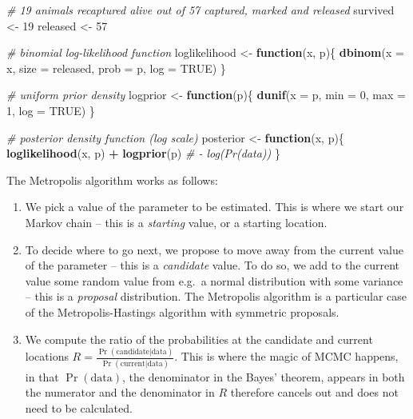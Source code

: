 \documentclass[
  12pt,
]{krantz}
\newenvironment{Shaded}{\begin{snugshade}}{\end{snugshade}}
\newcommand{\AttributeTok}[1]{\textcolor[rgb]{0.13,0.29,0.53}{#1}}
\newcommand{\CommentTok}[1]{\textcolor[rgb]{0.56,0.35,0.01}{\textit{#1}}}
\newcommand{\ConstantTok}[1]{\textcolor[rgb]{0.56,0.35,0.01}{#1}}
\newcommand{\ControlFlowTok}[1]{\textcolor[rgb]{0.13,0.29,0.53}{\textbf{#1}}}
\newcommand{\DecValTok}[1]{\textcolor[rgb]{0.00,0.00,0.81}{#1}}
\newcommand{\FunctionTok}[1]{\textcolor[rgb]{0.13,0.29,0.53}{\textbf{#1}}}
\newcommand{\NormalTok}[1]{#1}
\newcommand{\OtherTok}[1]{\textcolor[rgb]{0.56,0.35,0.01}{#1}}
\newcommand{\SpecialCharTok}[1]{\textcolor[rgb]{0.81,0.36,0.00}{\textbf{#1}}}
\begin{document}
\begin{Shaded}
\begin{Highlighting}[]
\CommentTok{\# 19 animals recaptured alive out of 57 captured, marked and released}
\NormalTok{survived }\OtherTok{\textless{}{-}} \DecValTok{19}
\NormalTok{released }\OtherTok{\textless{}{-}} \DecValTok{57}

\CommentTok{\# binomial log{-}likelihood function}
\NormalTok{loglikelihood }\OtherTok{\textless{}{-}} \ControlFlowTok{function}\NormalTok{(x, p)\{}
  \FunctionTok{dbinom}\NormalTok{(}\AttributeTok{x =}\NormalTok{ x, }\AttributeTok{size =}\NormalTok{ released, }\AttributeTok{prob =}\NormalTok{ p, }\AttributeTok{log =} \ConstantTok{TRUE}\NormalTok{)}
\NormalTok{\}}

\CommentTok{\# uniform prior density}
\NormalTok{logprior }\OtherTok{\textless{}{-}} \ControlFlowTok{function}\NormalTok{(p)\{}
  \FunctionTok{dunif}\NormalTok{(}\AttributeTok{x =}\NormalTok{ p, }\AttributeTok{min =} \DecValTok{0}\NormalTok{, }\AttributeTok{max =} \DecValTok{1}\NormalTok{, }\AttributeTok{log =} \ConstantTok{TRUE}\NormalTok{)}
\NormalTok{\}}

\CommentTok{\# posterior density function (log scale)}
\NormalTok{posterior }\OtherTok{\textless{}{-}} \ControlFlowTok{function}\NormalTok{(x, p)\{}
  \FunctionTok{loglikelihood}\NormalTok{(x, p) }\SpecialCharTok{+} \FunctionTok{logprior}\NormalTok{(p) }\CommentTok{\# {-} log(Pr(data))}
\NormalTok{\}}
\end{Highlighting}
\end{Shaded}

The Metropolis algorithm works as follows:

\begin{enumerate}
\def\labelenumi{\arabic{enumi}.}
\item
  We pick a value of the parameter to be estimated. This is where we start our Markov chain -- this is a \emph{starting} value, or a starting location.
\item
  To decide where to go next, we propose to move away from the current value of the parameter -- this is a \emph{candidate} value. To do so, we add to the current value some random value from e.g.~a normal distribution with some variance -- this is a \emph{proposal} distribution. The Metropolis algorithm is a particular case of the Metropolis-Hastings algorithm with symmetric proposals.
\item
  We compute the ratio of the probabilities at the candidate and current locations \(R=\displaystyle{\frac{{\Pr(\text{candidate}|\text{data})}}{{\Pr(\text{current}|\text{data})}}}\). This is where the magic of MCMC happens, in that \(\Pr(\text{data})\), the denominator in the Bayes' theorem, appears in both the numerator and the denominator in \(R\) therefore cancels out and does not need to be calculated.
\end{enumerate}
\end{document}
